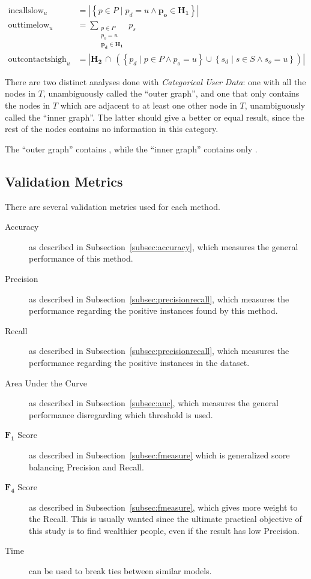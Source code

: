 \begin{equation}
\label{eq:categoricaluserdata}
\begin{split}
	\operatorname{incallslow}_u &= \left| \left\{ p \in P \mid p_d = u \land \mathbf{p_o \in H_1} \right\} \right| \\
	\operatorname{outtimelow}_u &= \sum_{\substack{p \in P \\ p_o = u \\ \mathbf{p_d \in H_1}}} \, p_s \\
	\operatorname{outcontactshigh}_u &= \left| \mathbf{H_2 \, \cap} \, \left( \left\{ p_d \mid p \in P \land p_o = u \right\} \cup \left\{ s_d \mid s \in S \land s_o = u \right\} \right) \right|
\end{split}
\end{equation}

There are two distinct analyses done with \emph{Categorical User Data}: one with all the nodes in $T$, unambiguously called the ``outer graph'', and one that only contains the nodes in $T$ which are adjacent to at least one other node in $T$, unambiguously called the ``inner graph''. The latter should give a better or equal result, since the rest of the nodes contains no information in this category.

The ``outer graph'' contains , while the ``inner graph'' contains only .

\subsection{Validation Metrics}
\label{subsec:validationmetrics}
There are several validation metrics used for each method.

\begin{description}
	\item[Accuracy] as described in Subsection~\ref{subsec:accuracy}, which measures the general performance of this method.
	\item[Precision] as described in Subsection~\ref{subsec:precisionrecall}, which measures the performance regarding the positive instances found by this method.
	\item[Recall] as described in Subsection~\ref{subsec:precisionrecall}, which measures the performance regarding the positive instances in the dataset.
	\item[Area Under the Curve] as described in Subsection~\ref{subsec:auc}, which measures the general performance disregarding which threshold is used.
	\item[$\mathbf{F_1}$ Score] as described in Subsection~\ref{subsec:fmeasure} which is generalized score balancing Precision and Recall.
	\item[$\mathbf{F_4}$ Score] as described in Subsection~\ref{subsec:fmeasure}, which gives more weight to the Recall. This is usually wanted since the ultimate practical objective of this study is to find wealthier people, even if the result has low Precision.
	\item[Time] can be used to break ties between similar models.
\end{description}

